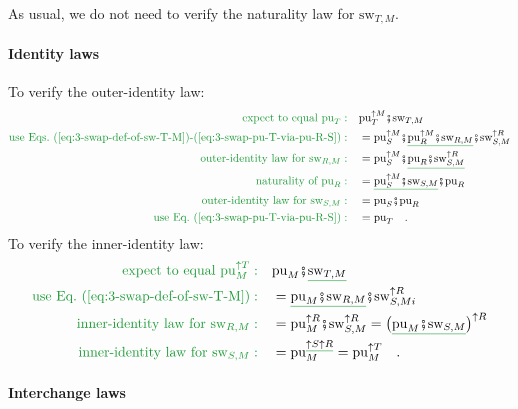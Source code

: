 As usual, we do not need to verify the naturality law for $\text{sw}_{T,M}$.

\paragraph{Identity laws}

To verify the outer-identity law:
\begin{align*}
{\color{greenunder}\text{expect to equal }\text{pu}_{T}:}\quad & \text{pu}_{T}^{\uparrow M}\bef\text{sw}_{T,M}\\
{\color{greenunder}\text{use Eqs.~(\ref{eq:3-swap-def-of-sw-T-M})-(\ref{eq:3-swap-pu-T-via-pu-R-S})}:}\quad & =\text{pu}_{S}^{\uparrow M}\bef\gunderline{\text{pu}_{R}^{\uparrow M}\bef\text{sw}_{R,M}}\bef\text{sw}_{S,M}^{\uparrow R}\\
{\color{greenunder}\text{outer-identity law for }\text{sw}_{R,M}:}\quad & =\text{pu}_{S}^{\uparrow M}\bef\gunderline{\text{pu}_{R}\bef\text{sw}_{S,M}^{\uparrow R}}\\
{\color{greenunder}\text{naturality of }\text{pu}_{R}:}\quad & =\gunderline{\text{pu}_{S}^{\uparrow M}\bef\text{sw}_{S,M}}\bef\text{pu}_{R}\\
{\color{greenunder}\text{outer-identity law for }\text{sw}_{S,M}:}\quad & =\text{pu}_{S}\bef\text{pu}_{R}\\
{\color{greenunder}\text{use Eq.~(\ref{eq:3-swap-pu-T-via-pu-R-S})}:}\quad & =\text{pu}_{T}\quad.
\end{align*}
To verify the inner-identity law:
\begin{align*}
{\color{greenunder}\text{expect to equal }\text{pu}_{M}^{\uparrow T}:}\quad & \text{pu}_{M}\bef\gunderline{\text{sw}_{T,M}}\\
{\color{greenunder}\text{use Eq.~(\ref{eq:3-swap-def-of-sw-T-M})}:}\quad & =\gunderline{\text{pu}_{M}\bef\text{sw}_{R,M}}\bef\text{sw}_{S,Mi}^{\uparrow R}\\
{\color{greenunder}\text{inner-identity law for }\text{sw}_{R,M}:}\quad & =\text{pu}_{M}^{\uparrow R}\bef\text{sw}_{S,M}^{\uparrow R}=\big(\gunderline{\text{pu}_{M}\bef\text{sw}_{S,M}}\big)^{\uparrow R}\\
{\color{greenunder}\text{inner-identity law for }\text{sw}_{S,M}:}\quad & =\text{pu}_{M}^{\gunderline{\uparrow S\uparrow R}}=\text{pu}_{M}^{\uparrow T}\quad.
\end{align*}


\paragraph{Interchange laws}

